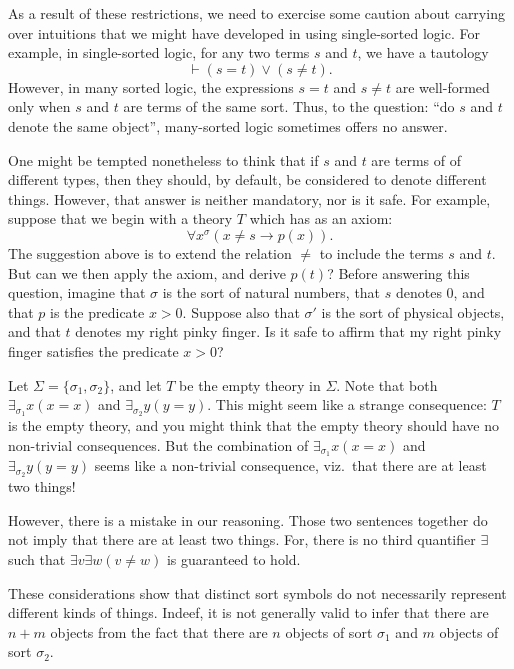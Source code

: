 As a result of these restrictions, we need to exercise some caution
about carrying over intuitions that we might have developed in using
single-sorted logic.  For example, in single-sorted logic, for any two
terms $s$ and $t$, we have a tautology
\[ \vdash (s=t)\vee (s\neq t) .\] However, in many sorted logic, the
expressions $s=t$ and $s\neq t$ are well-formed only when $s$ and $t$
are terms of the same sort.  Thus, to the question: ``do $s$ and $t$
denote the same object'', many-sorted logic sometimes offers no
answer.

One might be tempted nonetheless to think that if $s$ and $t$ are
terms of of different types, then they should, by default, be
considered to denote different things.  However, that answer is
neither mandatory, nor is it safe.  For example, suppose that we begin
with a theory $T$ which has as an axiom:
\[ \forall x^{\sigma} (x\neq s\to p(x)) .\] The suggestion above is to
extend the relation $\neq$ to include the terms $s$ and $t$.  But can
we then apply the axiom, and derive $p(t)$?  Before answering this
question, imagine that $\sigma$ is the sort of natural numbers, that
$s$ denotes $0$, and that $p$ is the predicate $x>0$.  Suppose also
that $\sigma '$ is the sort of physical objects, and that $t$ denotes
my right pinky finger.  Is it safe to affirm that my right pinky
finger satisfies the predicate $x>0$?



\begin{example} \label{two-sort} Let
  $\Sigma = \{ \sigma _1,\sigma _2 \}$, and let $T$ be the empty
  theory in $\Sigma$.  Note that both $\exists _{\sigma _1}x(x=x)$ and
  $\exists _{\sigma _2}y(y=y)$.  This might seem like a strange
  consequence: $T$ is the empty theory, and you might think that the
  empty theory should have no non-trivial consequences.  But the
  combination of $\exists _{\sigma _1}x(x=x)$ and
  $\exists _{\sigma _2}y(y=y)$ seems like a non-trivial consequence,
  viz.\ that there are at least two things!

  However, there is a mistake in our reasoning.  Those two sentences
  together do not imply that there are at least two things.  For,
  there is no third quantifier $\exists$ such that
  $\exists v\exists w(v\neq w)$ is guaranteed to hold.

  These considerations show that distinct sort symbols do not
  necessarily represent different kinds of things.  Indeef, it is not
  generally valid to infer that there are $n+m$ objects from the fact
  that there are $n$ objects of sort $\sigma _1$ and $m$ objects of
  sort $\sigma _2$.  \end{example}

